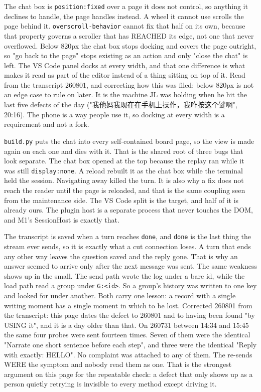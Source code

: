 The chat box is \texttt{position:fixed} over a page it does not control, so anything it declines to handle, the page handles instead. A wheel it cannot use scrolls the page behind it. \texttt{overscroll-behavior} cannot fix that half on its own, because that property governs a scroller that has REACHED its edge, not one that never overflowed. Below 820px the chat box stops docking and covers the page outright, so "go back to the page" stops existing as an action and only "close the chat" is left. The VS Code panel docks at every width, and that one difference is what makes it read as part of the editor instead of a thing sitting on top of it. Read from the transcript 260801, and correcting how this was filed: below 820px is not an edge case to rule on later. It is the machine JL was holding when he hit the last five defects of the day ("我他妈我现在在手机上操作，我咋按这个键啊", 20:16). The phone is a way people use it, so docking at every width is a requirement and not a fork.

\texttt{build.py} puts the chat into every self-contained board page, so the view is made again on each one and dies with it. That is the shared root of three bugs that look separate. The chat box opened at the top because the replay ran while it was still \texttt{display:none}. A reload rebuilt it as the chat box while the terminal held the session. Navigating away killed the turn. It is also why a fix does not reach the reader until the page is reloaded, and that is the same coupling seen from the maintenance side. The VS Code split is the target, and half of it is already ours. The plugin host is a separate process that never touches the DOM, and M1's SessionHost is exactly that.

The transcript is saved when a turn reaches \texttt{done}, and \texttt{done} is the last thing the stream ever sends, so it is exactly what a cut connection loses. A turn that ends any other way leaves the question saved and the reply gone. That is why an answer seemed to arrive only after the next message was sent. The same weakness shows up in the small. The send path wrote the log under a bare id, while the load path read a group under \texttt{G:<id>}. So a group's history was written to one key and looked for under another. Both carry one lesson: a record with a single writing moment has a single moment in which to be lost. Corrected 260801 from the transcript: this page dates the defect to 260801 and to having been found "by USING it", and it is a day older than that. On 260731 between 14:34 and 15:45 the same four probes were sent fourteen times. Seven of them were the identical "Narrate one short sentence before each step", and three were the identical "Reply with exactly: HELLO". No complaint was attached to any of them. The re-sends WERE the symptom and nobody read them as one. That is the strongest argument on this page for the repeatable check: a defect that only shows up as a person quietly retrying is invisible to every method except driving it.

